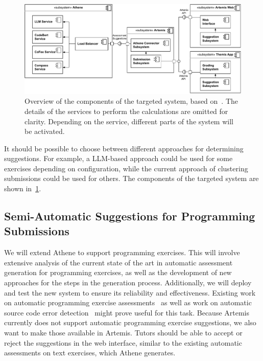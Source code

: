 \begin{figure}[ht]
    \centering
    \includegraphics[width=0.9\linewidth]{figures/proposal/component.pdf}
    \caption{Overview of the components of the targeted system, based on~\cite{atheneLoadBalancer}. The details of the services to perform the calculations are omitted for clarity. Depending on the service, different parts of the system will be activated.}
    \label{fig:component}
\end{figure}
It should be possible to choose between different approaches for determining suggestions. For example, a LLM-based approach could be used for some exercises depending on configuration, while the current approach of clustering submissions could be used for others. The components of the targeted system are shown in~\cref{fig:component}. %

\subsection{Semi-Automatic Suggestions for Programming Submissions}
We will extend Athene to support programming exercises. This will involve extensive analysis of the current state of the art in automatic assessment generation for programming exercises, as well as the development of new approaches for the steps in the generation process. Additionally, we will deploy and test the new system to ensure its reliability and effectiveness.
Existing work on automatic programming exercise assessments~\cite{singh2013automated,messer2022grading} as well as work on automatic source code error detection~\cite{sourceCodeAssessment} might prove useful for this task.
%
Because Artemis currently does not support automatic programming exercise suggestions, we also want to make those available in Artemis. Tutors should be able to accept or reject the suggestions in the web interface, similar to the existing automatic assessments on text exercises, which Athene generates. 

